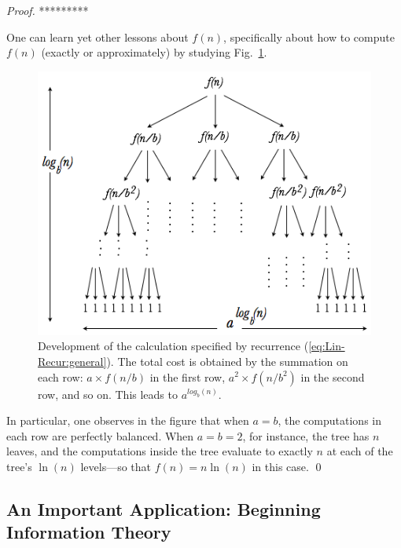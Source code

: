 \begin{proof}
{%
*********}


One can learn yet other lessons about $f(n)$, specifically about how
to compute $f(n)$ (exactly or approximately) by studying
Fig.~\ref{fig:masterTheorem}.
\begin{figure}[htb]
\begin{center}
       \includegraphics[scale=0.4]{FiguresMaths/MasterTheoremgeneral}
\caption{Development of the calculation specified by recurrence
  (\ref{eq:Lin-Recur:general}).  The total cost is obtained by the summation on each row:
  $a \times f(n/b)$ in the first row, $a^2 \times f(n/b^2)$ in the second row, and so on.
  This leads to $a^{log_b(n)}$.
\label{fig:masterTheorem}}
\end{center}
\end{figure}
In particular, one observes in the figure that when $a=b$, the
computations in each row are perfectly balanced.  When $a=b=2$, for
instance, the tree has $n$ leaves, and the computations inside the
tree evaluate to exactly $n$ at each of the tree's $ \ln(n)$
levels---so that $f(n) = n \ln(n)$ in this case.  \qed
\end{proof}


\subsection{An Important Application: Beginning Information Theory}
\label{sec:count-strings}


